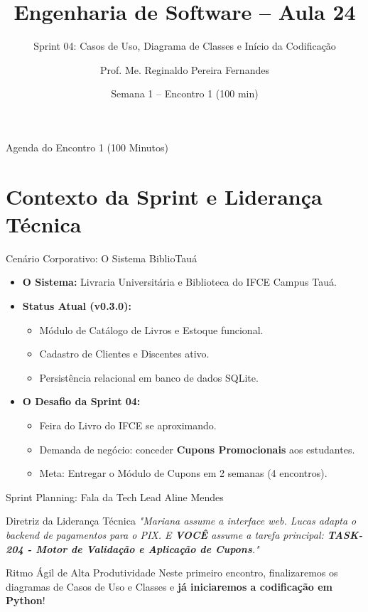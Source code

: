 \documentclass[10pt]{beamer}
\title[Engenharia de Software -- Aula 24]{Engenharia de Software -- Aula 24}
\subtitle{Sprint 04: Casos de Uso, Diagrama de Classes e Início da Codificação}
\author[Prof. Me. Reginaldo Fernandes]{Prof. Me. Reginaldo Pereira Fernandes}
\institute[IFCE Campus Tauá]{
    Instituto Federal de Educação, Ciência e Tecnologia do Ceará -- Campus Tauá\\
    Técnico em Informática para Internet (TSII.210)
}
\date{Semana 1 -- Encontro 1 (100 min)}
\begin{document}
\begin{frame}
    \titlepage
\end{frame}

\begin{frame}{Agenda do Encontro 1 (100 Minutos)}
    \tableofcontents
\end{frame}

\section{Contexto da Sprint e Liderança Técnica}

\begin{frame}{Cenário Corporativo: O Sistema BiblioTauá}
    \begin{itemize}
        \item \textbf{O Sistema:} Livraria Universitária e Biblioteca do IFCE Campus Tauá.
        \item \textbf{Status Atual (v0.3.0):}
        \begin{itemize}
            \item Módulo de Catálogo de Livros e Estoque funcional.
            \item Cadastro de Clientes e Discentes ativo.
            \item Persistência relacional em banco de dados SQLite.
        \end{itemize}
        \item \textbf{O Desafio da Sprint 04:}
        \begin{itemize}
            \item Feira do Livro do IFCE se aproximando.
            \item Demanda de negócio: conceder \textbf{Cupons Promocionais} aos estudantes.
            \item Meta: Entregar o Módulo de Cupons em 2 semanas (4 encontros).
        \end{itemize}
    \end{itemize}
\end{frame}

\begin{frame}{Sprint Planning: Fala da Tech Lead Aline Mendes}
    \begin{block}{Diretriz da Liderança Técnica}
    \textit{"Mariana assume a interface web. Lucas adapta o backend de pagamentos para o PIX. E \textbf{VOCÊ} assume a tarefa principal: \textbf{TASK-204 - Motor de Validação e Aplicação de Cupons}."}
    \end{block}
    \vspace{0.3cm}
    \begin{alertblock}{Ritmo Ágil de Alta Produtividade}
    Neste primeiro encontro, finalizaremos os diagramas de Casos de Uso e Classes e \textbf{já iniciaremos a codificação em Python}!
    \end{alertblock}
\end{frame}
\end{document}
